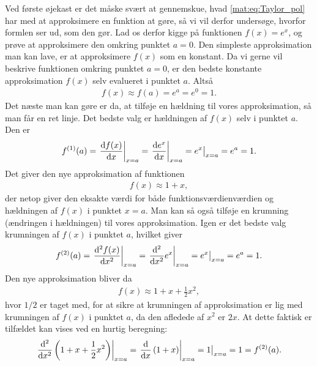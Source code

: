 %
Ved første øjekast er det måske svært at gennemskue, hvad \cref{mat:eq:Taylor_pol} har med at approksimere en funktion at gøre, så vi vil derfor undersøge, hvorfor formlen ser ud, som den gør. Lad os derfor kigge på funktionen $f(x) = e^x$, og prøve at approksimere den omkring punktet $a = 0$. Den simpleste approksimation man kan lave, er at approksimere $f(x)$ som en konstant. Da vi gerne vil beskrive funktionen omkring punktet $a=0$, er den bedste konstante approksimation $f(x)$ selv evalueret i punktet $a$. Altså
%
\begin{align}
    f(x) \approx f(a) = e^a = e^0 = 1.
\end{align}
%
Det næste man kan gøre er da, at tilføje en hældning til vores approksimation, så man får en ret linje. Det bedste valg er hældningen af $f(x)$ selv i punktet $a$. Den er
%
\begin{align}
    f^{(1)}(a) = \left. \dv{f(x)}{x} \right|_{x=a} = \left. \dv{e^x}{x} \right|_{x=a} = e^x \big|_{x=a} = e^a = 1.
\end{align}
%
Det giver den nye approksimation af funktionen
%
\begin{align}
    f(x) \approx 1 + x,
\end{align}
%
der netop giver den eksakte værdi for både funktionsværdienværdien og hældningen af $f(x)$ i punktet $x=a$. Man kan så også tilføje en krumning (ændringen i hældningen) til vores approksimation. Igen er det bedste valg krumningen af $f(x)$ i punktet $a$, hvilket giver
%
\begin{align}
    f^{(2)}(a) = \left. \dv[2]{f(x)}{x} \right|_{x=a} = \left. \dv[2]{}{x} e^x \right|_{x=a} = e^x \big|_{x=a} = e^a = 1.
\end{align}
%
Den nye approksimation bliver da
%
\begin{align}
    f(x) \approx 1 +  x + \frac{1}{2} x^2,
\end{align}
%
hvor $1/2$ er taget med, for at sikre at krumningen af approksimation er lig med krumningen af $f(x)$ i punktet $a$, da den afledede af $x^2$ er $2x$. At dette faktisk er tilfældet kan vises ved en hurtig beregning:
%
\begin{align}
    \left. \dv[2]{}{x} \left(1+x+\frac{1}{2}x^2\right) \right|_{x=a} = \left. \dv{}{x} \left(1+x\right) \right|_{x=a} = 1 \big|_{x=a} = 1 = f^{(2)}(a).
\end{align}
%
